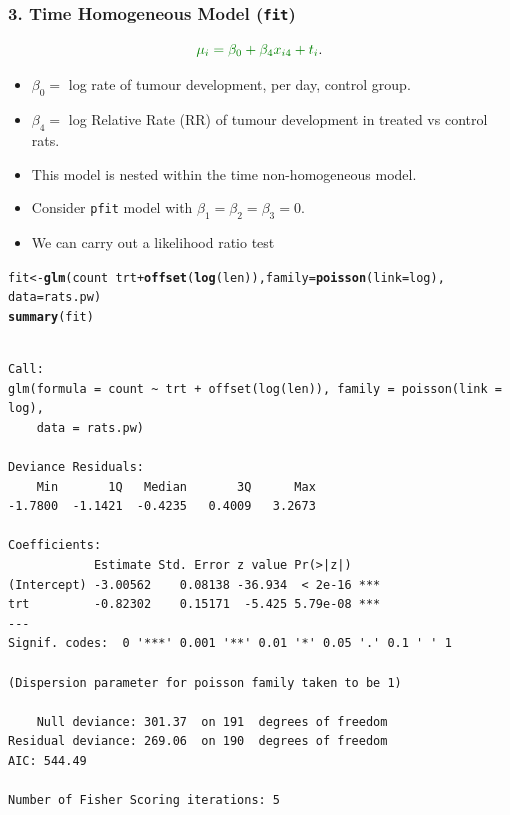 \documentclass[oneside]{book}\usepackage[]{graphicx}\usepackage[svgnames]{xcolor}
\makeatletter
\newcommand{\hlopt}[1]{\textcolor[rgb]{0,0,0}{#1}}%
\newcommand{\hlstd}[1]{\textcolor[rgb]{0.345,0.345,0.345}{#1}}%
\newcommand{\hlkwb}[1]{\textcolor[rgb]{0.69,0.353,0.396}{#1}}%
\newcommand{\hlkwc}[1]{\textcolor[rgb]{0.333,0.667,0.333}{#1}}%
\newcommand{\hlkwd}[1]{\textcolor[rgb]{0.737,0.353,0.396}{\textbf{#1}}}%
\newenvironment{kframe}{%
 \def\at@end@of@kframe{}%
 \ifinner\ifhmode%
  \def\at@end@of@kframe{\end{minipage}}%
  \begin{minipage}{\columnwidth}%
 \fi\fi%
 \def\FrameCommand##1{\hskip\@totalleftmargin \hskip-\fboxsep
 \colorbox{shadecolor}{##1}\hskip-\fboxsep
     \hskip-\linewidth \hskip-\@totalleftmargin \hskip\columnwidth}%
 \MakeFramed {\advance\hsize-\width
   \@totalleftmargin\z@ \linewidth\hsize
   \@setminipage}}%
 {\par\unskip\endMakeFramed%
 \at@end@of@kframe}
\newenvironment{knitrout}{}{} %
\let\log\relax%
\makeatother
\begin{document}
\subsubsection*{3. Time Homogeneous Model (\texttt{fit})}
\[ \textcolor{Green}{\log{\mu_i}=\beta_0+\beta_4x_{i4}+\log{t_i}}. \]
\begin{itemize}
    \item $ \beta_0= $ log rate of tumour development, per day, control group.
    \item $ \beta_4= $ log Relative Rate (RR) of tumour development in treated vs control rats.
    \item This model is nested within the time non-homogeneous model.
    \item Consider \texttt{pfit} model with $ \beta_1=\beta_2=\beta_3=0 $.
    \item We can carry out a likelihood ratio test
\end{itemize}
\begin{knitrout}
\color{fgcolor}\begin{kframe}
\begin{alltt}
\hlstd{fit} \hlkwb{<-} \hlkwd{glm}\hlstd{(count} \hlopt{~} \hlstd{trt} \hlopt{+} \hlkwd{offset}\hlstd{(}\hlkwd{log}\hlstd{(len)),} \hlkwc{family} \hlstd{=} \hlkwd{poisson}\hlstd{(}\hlkwc{link} \hlstd{= log),}
  \hlkwc{data} \hlstd{= rats.pw)}
\hlkwd{summary}\hlstd{(fit)}
\end{alltt}
\begin{verbatim}

Call:
glm(formula = count ~ trt + offset(log(len)), family = poisson(link = log), 
    data = rats.pw)

Deviance Residuals: 
    Min       1Q   Median       3Q      Max  
-1.7800  -1.1421  -0.4235   0.4009   3.2673  

Coefficients:
            Estimate Std. Error z value Pr(>|z|)    
(Intercept) -3.00562    0.08138 -36.934  < 2e-16 ***
trt         -0.82302    0.15171  -5.425 5.79e-08 ***
---
Signif. codes:  0 '***' 0.001 '**' 0.01 '*' 0.05 '.' 0.1 ' ' 1

(Dispersion parameter for poisson family taken to be 1)

    Null deviance: 301.37  on 191  degrees of freedom
Residual deviance: 269.06  on 190  degrees of freedom
AIC: 544.49

Number of Fisher Scoring iterations: 5
\end{verbatim}
\end{kframe}
\end{knitrout}
\end{document}
